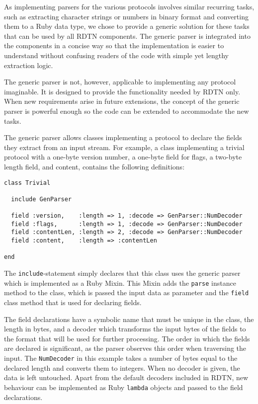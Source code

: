 \documentclass{article}
\begin{document}
As implementing parsers for the various protocols involves similar recurring
tasks, such as extracting character strings or numbers in binary format and
converting them to a Ruby data type, we chose to provide a generic solution for
these tasks that can be used by all RDTN components. The generic parser is
integrated into the components in a concise way so that
the implementation is easier to understand without confusing readers of the code
with simple yet lengthy extraction logic. 

The generic parser is not, however, applicable to implementing any protocol
imaginable. It is designed to provide the functionality needed by RDTN only.
When new requirements arise in future extensions, the concept of the generic
parser is powerful enough so the code can be extended to accommodate the new
tasks.

The generic parser allows classes implementing a protocol to declare the fields
they extract from an input stream. For example, a class implementing a trivial
protocol with a one-byte version number, a one-byte field for flags, a two-byte
length field, and content, contains the following definitions:

\begin{verbatim}
class Trivial

  include GenParser

  field :version,    :length => 1, :decode => GenParser::NumDecoder
  field :flags,      :length => 1, :decode => GenParser::NumDecoder
  field :contentLen, :length => 2, :decode => GenParser::NumDecoder
  field :content,    :length => :contentLen

end
\end{verbatim}

The {\tt include}-statement simply declares that this class uses the generic
parser which is implemented as a Ruby Mixin. This Mixin adds the {\tt parse}
instance method to the class, which is passed the input data as parameter and
the {\tt field} class method that is used for declaring fields.

 The field declarations have a symbolic name that must be unique in the class,
the length in bytes, and a decoder which transforms the input bytes of the
fields to the format that will be used for further processing.  The order in
which the fields are declared is significant, as the parser observes this order
when traversing the input.  The {\tt NumDecoder} in this example takes a number
of bytes equal to the declared length and converts them to integers. When no
decoder is given, the data is left untouched. Apart from the default decoders
included in RDTN, new behaviour can be implemented as Ruby {\tt lambda} objects
and passed to the field declarations.
\end{document}
